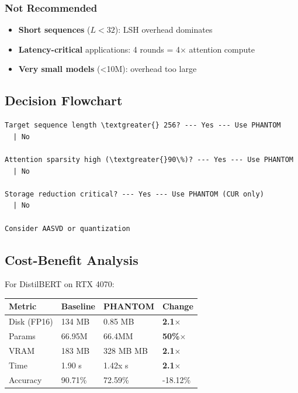 \subsubsection{Not Recommended}

\begin{itemize}
\item \textbf{Short sequences} ($L < 32$): LSH overhead dominates
\item \textbf{Latency-critical} applications: 4 rounds = 4$\times$ attention compute
\item \textbf{Very small models} (\textless{}10M): overhead too large

\end{itemize}
\subsection{Decision Flowchart}

\begin{lstlisting}
Target sequence length \textgreater{} 256? --- Yes --- Use PHANTOM
  | No
   
Attention sparsity high (\textgreater{}90\%)? --- Yes --- Use PHANTOM
  | No
   
Storage reduction critical? --- Yes --- Use PHANTOM (CUR only)
  | No
   
Consider AASVD or quantization
\end{lstlisting}

\subsection{Cost-Benefit Analysis}

For DistilBERT on RTX 4070:

\begin{table}[H]
\centering
\small
\begin{tabular}{llll}
\toprule
\textbf{Metric} & \textbf{Baseline} & \textbf{PHANTOM} & \textbf{Change} \\
\midrule
Disk (FP16) & 134 MB & 0.85 MB & \textbf{2.1$\times$} \\
Params & 66.95M & 66.4MM & \textbf{50\%$\times$} \\
VRAM & 183 MB & 328 MB MB & \textbf{2.1$\times$} \\
Time & 1.90 s & 1.42x s & \textbf{2.1$\times$} \\
Accuracy & 90.71\% & 72.59\% & -18.12\% \\
\bottomrule
\end{tabular}
\end{table}

